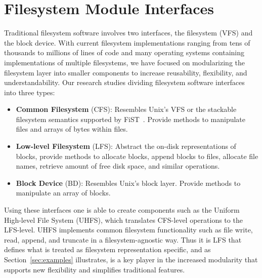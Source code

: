 \section{Filesystem Module Interfaces}
\label{sec:interfaces}

Traditional filesystem software involves two interfaces, the
filesystem (VFS) and the block device. With current filesystem
implementations ranging from tens of thousands to millions of lines of
code and many operating systems containing implementations of multiple
filesystems, we have focused on modularizing the filesystem layer into
smaller components to increase reusability, flexibility, and
understandability. Our research studies dividing filesystem software
interfaces into three types:

\begin{itemize}
\item \itemvspace{} {\bf Common Filesystem} (CFS): Resembles Unix's
  VFS or the stackable filesystem semantics supported by
  FiST~\cite{fist}. Provide methods to manipulate files and arrays of
  bytes within files.
\item \itemvspace{} {\bf Low-level Filesystem} (LFS): Abstract the
  on-disk representations of blocks, provide methods to allocate
  blocks, append blocks to files, allocate file names, retrieve amount
  of free disk space, and similar operations.
\item \itemvspace{} {\bf Block Device} (BD): Resembles Unix's block
  layer. Provide methods to manipulate an array of blocks.
\end{itemize}
\postlistspacing{}

Using these interfaces one is able to create components such as the
Uniform High-level File System (UHFS), which translates CFS-level
operations to the LFS-level. UHFS implements common filesystem
functionality such as file write, read, append, and truncate in a
filesystem-agnostic way. Thus it is LFS that defines what is treated
as filesystem representation specific, and as
Section~\ref{sec:examples} illustrates, is a key player in the
increased modularity that supports new flexibility and simplifies
traditional features.
